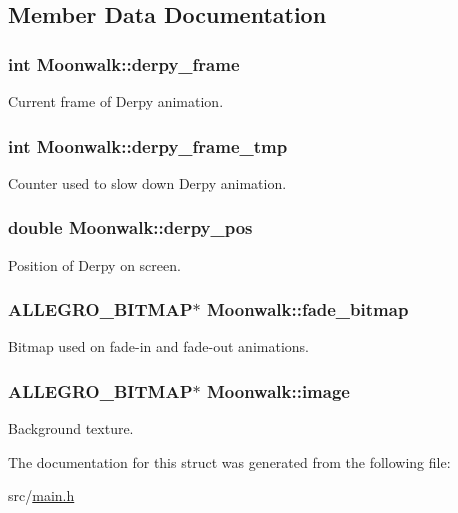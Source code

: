 \subsection{\-Member \-Data \-Documentation}
\hypertarget{structMoonwalk_a4a3874c58e11745d4896b004861e1555}{
\subsubsection[{derpy\-\_\-frame}]{\setlength{\rightskip}{0pt plus 5cm}int {\bf \-Moonwalk\-::derpy\-\_\-frame}}}\label{structMoonwalk_a4a3874c58e11745d4896b004861e1555}
\-Current frame of \-Derpy animation. \hypertarget{structMoonwalk_ab087ba01cd2a107286ec8f75f58c676c}{
\subsubsection[{derpy\-\_\-frame\-\_\-tmp}]{\setlength{\rightskip}{0pt plus 5cm}int {\bf \-Moonwalk\-::derpy\-\_\-frame\-\_\-tmp}}}\label{structMoonwalk_ab087ba01cd2a107286ec8f75f58c676c}
\-Counter used to slow down \-Derpy animation. \hypertarget{structMoonwalk_a69689c77a64928bfb52c1dc1e1f7b33f}{
\subsubsection[{derpy\-\_\-pos}]{\setlength{\rightskip}{0pt plus 5cm}double {\bf \-Moonwalk\-::derpy\-\_\-pos}}}\label{structMoonwalk_a69689c77a64928bfb52c1dc1e1f7b33f}
\-Position of \-Derpy on screen. \hypertarget{structMoonwalk_adfea9d8976238abf5d94a797df7ee929}{
\subsubsection[{fade\-\_\-bitmap}]{\setlength{\rightskip}{0pt plus 5cm}\-A\-L\-L\-E\-G\-R\-O\-\_\-\-B\-I\-T\-M\-A\-P$\ast$ {\bf \-Moonwalk\-::fade\-\_\-bitmap}}}\label{structMoonwalk_adfea9d8976238abf5d94a797df7ee929}
\-Bitmap used on fade-\/in and fade-\/out animations. \hypertarget{structMoonwalk_a99f8ce8d3a4a8c3faca18b7c36eccdca}{
\subsubsection[{image}]{\setlength{\rightskip}{0pt plus 5cm}\-A\-L\-L\-E\-G\-R\-O\-\_\-\-B\-I\-T\-M\-A\-P$\ast$ {\bf \-Moonwalk\-::image}}}\label{structMoonwalk_a99f8ce8d3a4a8c3faca18b7c36eccdca}
\-Background texture. 

\-The documentation for this struct was generated from the following file\-:\begin{DoxyCompactItemize}
\item 
src/\hyperlink{main_8h}{main.\-h}\end{DoxyCompactItemize}
